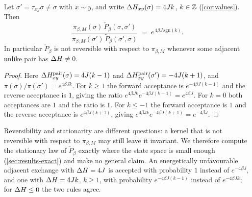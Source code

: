 \begin{proposition}\label{prop:flux}
Let $\sigma'=\tau_{xy}\sigma\ne\sigma$ with $x\sim y$, and write $\Delta H_{xy}(\sigma)=4Jk$, $k\in\mathbb{Z}$ (\cref{cor:values}). Then
\begin{equation}
\frac{\pi_{\beta,M}(\sigma)\,\tilde P_\beta(\sigma,\sigma')}{\pi_{\beta,M}(\sigma')\,\tilde P_\beta(\sigma',\sigma)}\;=\;e^{\,4\beta J\,\mathrm{sgn}(k)} .
\label{eq:flux}
\end{equation}
In particular $\tilde P_\beta$ is not reversible with respect to $\pi_{\beta,M}$ whenever some adjacent unlike pair has $\Delta H\ne0$.
\end{proposition}
\begin{proof}
Here $\Delta H^{\mathrm{pair}}_{xy}(\sigma)=4J(k-1)$ and $\Delta H^{\mathrm{pair}}_{xy}(\sigma')=-4J(k+1)$, and $\pi(\sigma)/\pi(\sigma')=e^{4\beta Jk}$. For $k\ge1$ the forward acceptance is $e^{-4\beta J(k-1)}$ and the reverse acceptance is $1$, giving the ratio $e^{4\beta Jk}e^{-4\beta J(k-1)}=e^{4\beta J}$. For $k=0$ both acceptances are $1$ and the ratio is $1$. For $k\le-1$ the forward acceptance is $1$ and the reverse acceptance is $e^{4\beta J(k+1)}$, giving $e^{4\beta Jk}e^{-4\beta J(k+1)}=e^{-4\beta J}$.
\end{proof}
Reversibility and stationarity are different questions: a kernel that is not reversible with respect to $\pi_{\beta,M}$ may still leave it invariant. We therefore compute the stationary law of $\tilde P_\beta$ exactly where the state space is small enough (\cref{sec:results-exact}) and make no general claim. An energetically unfavourable adjacent exchange with $\Delta H=4J$ is accepted with probability $1$ instead of $e^{-4\beta J}$, and one with $\Delta H=4Jk$, $k\ge 1$, with probability $e^{-4\beta J(k-1)}$ instead of $e^{-4\beta Jk}$; for $\Delta H\le0$ the two rules agree.

